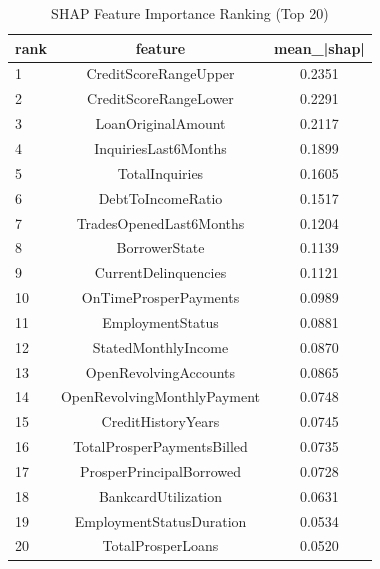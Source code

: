 \begin{table}
\centering
\caption{SHAP Feature Importance Ranking (Top 20)}
\label{tab:shap_ranking}
\begin{tabular}{lcc}
\toprule
rank & feature & mean_|shap| \\
\midrule
1 & CreditScoreRangeUpper & 0.2351 \\
2 & CreditScoreRangeLower & 0.2291 \\
3 & LoanOriginalAmount & 0.2117 \\
4 & InquiriesLast6Months & 0.1899 \\
5 & TotalInquiries & 0.1605 \\
6 & DebtToIncomeRatio & 0.1517 \\
7 & TradesOpenedLast6Months & 0.1204 \\
8 & BorrowerState & 0.1139 \\
9 & CurrentDelinquencies & 0.1121 \\
10 & OnTimeProsperPayments & 0.0989 \\
11 & EmploymentStatus & 0.0881 \\
12 & StatedMonthlyIncome & 0.0870 \\
13 & OpenRevolvingAccounts & 0.0865 \\
14 & OpenRevolvingMonthlyPayment & 0.0748 \\
15 & CreditHistoryYears & 0.0745 \\
16 & TotalProsperPaymentsBilled & 0.0735 \\
17 & ProsperPrincipalBorrowed & 0.0728 \\
18 & BankcardUtilization & 0.0631 \\
19 & EmploymentStatusDuration & 0.0534 \\
20 & TotalProsperLoans & 0.0520 \\
\bottomrule
\end{tabular}
\end{table}
